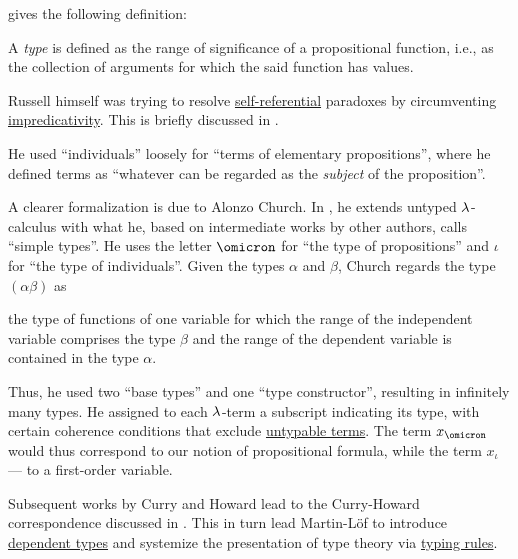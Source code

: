 \begin{remark}\label{rem:type_theory}
   gives the following definition:
  \begin{displayquote}
    A \textit{type} is defined as the range of significance of a propositional function, i.e., as the collection of arguments for which the said function has values.
  \end{displayquote}

  Russell himself was trying to resolve \hyperref[rem:self_reference]{self-referential} paradoxes by circumventing \hyperref[con:impredicativity]{impredicativity}. This is briefly discussed in .

  He used \enquote{individuals} loosely for \enquote{terms of elementary propositions}, where he defined terms as \enquote{whatever can be regarded as the \textit{subject} of the proposition}.

  A clearer formalization is due to Alonzo Church. In \cite{Church1940STT}, he extends untyped \( \mathrm{\lambda} \)-calculus with what he, based on intermediate works by other authors, calls \enquote{simple types}. He uses the letter \( \omicron \) for \enquote{the type of propositions} and \( \iota \) for \enquote{the type of individuals}. Given the types \( \alpha \) and \( \beta \), Church regards the type \( (\alpha\beta) \) as
  \begin{displayquote}
    \textellipsis the type of functions of one variable for which the range of the independent variable comprises the type \( \beta \) and the range of the dependent variable is contained in the type \( \alpha \).
  \end{displayquote}

  Thus, he used two \enquote{base types} and one \enquote{type constructor}, resulting in infinitely many types. He assigned to each \( \mathrm{\lambda} \)-term a subscript indicating its type, with certain coherence conditions that exclude \hyperref[def:typability]{untypable terms}. The term \( x_\omicron \) would thus correspond to our notion of propositional formula, while the term \( x_\iota \) --- to a first-order variable.

  Subsequent works by Curry and Howard lead to the Curry-Howard correspondence discussed in . This in turn lead Martin-Löf to introduce \hyperref[con:dependent_types]{dependent types} and systemize the presentation of type theory via \hyperref[con:typing_rule]{typing rules}.


\end{remark}
